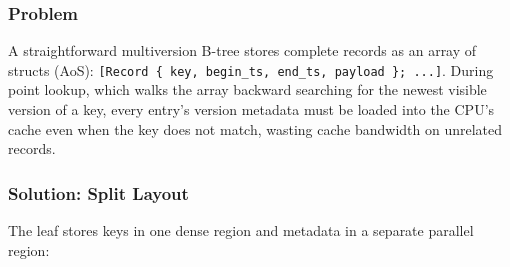 \documentclass[11pt]{article}
\newcommand{\code}[1]{\texttt{#1}}
\begin{document}
\subsubsection{Problem}

A straightforward multiversion B-tree stores complete records as an array of structs
(AoS): \code{[Record \{ key, begin\_ts, end\_ts, payload \}; ...]}. During point lookup,
which walks the array backward searching for the newest visible version of a key, every
entry's version metadata must be loaded into the CPU's cache even when the key does not
match, wasting cache bandwidth on unrelated records.

\subsubsection{Solution: Split Layout}

The leaf stores keys in one dense region and metadata in a separate parallel region:
\end{document}
